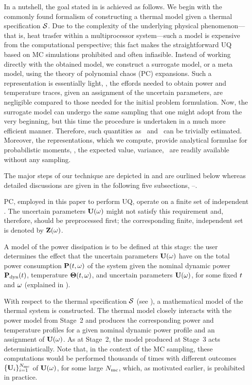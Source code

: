 
In a nutshell, the goal stated in  is achieved as follows. We begin with the commonly found formalism of constructing a thermal model given a thermal specification $\mathcal{S}$. Due to the complexity of the underlying physical phenomenon---that is, heat trasfer within a multiprocessor system---such a model is expensive from the computational perspective; this fact makes the straightforward UQ based on MC simulations prohibited and often infiasible. Instead of working directly with the obtained model, we construct a surrogate model, or a meta model, using the theory of polynomial chaos (PC) expansions. Such a representation is essentially light, \ie, the effords needed to obtain power and temperature traces, given an assignment of the uncertain parameters, are negligible compared to those needed for the initial problem formulation. Now, the surrogate model can undergo the same sampling that one might adopt from the very beginning, but this time the procedure is undertaken in a much more efficient manner. Therefore, such quantities as \cdfs\ and \pdfs\ can be trivially estimated. Moreover, the representations, which we compute, provide analytical formulae for probabilistic moments, \ie, the expected value, variance, \etc\ are readily available without any sampling.

The major steps of our technique are depicted in  and are ourlined below whereas detailed discussions are given in the following five subsections, --.

 PC, employed in this paper to perform UQ, operate on a finite set of independent \rvs. The uncertain parameters $\mathbf{U}(\omega)$ might not satisfy this requirement and, therefore, should be preprocessed first; the corresponding finite, independent set is denoted by $\mathbf{Z}(\omega)$.

 A model of the power dissipation is to be defined at this stage: the user determines the effect that the uncertain parameters $\mathbf{U}(\omega)$ have on the total power consumption $\mathbf{P}(t, \omega)$ of the system given the nominal dynamic power $\mathbf{P}_{\text{dyn}}(t)$, temperature ${\boldsymbol\Theta}(t, \omega)$, and uncertain parameters $\mathbf{U}(\omega)$, for some fixed $t$ and $\omega$ (explained in ).

 With respect to the thermal specification $\mathcal{S}$ (see ), a mathematical model of the thermal system is constructed. The thermal model closely interacts with the power model from Stage~2 and produces the corresponding power and temperature profiles for a given nominal dynamic power profile and an assignment of $\mathbf{U}(\omega)$. As at Stage~2, the model produced at Stage~3 acts deterministically. Note that, in the context of the MC sampling, these computations would be performed thousands of times with different outcomes $\{ \mathbf{U}_i \}_{i = 1}^{N_\text{mc}}$ of $\mathbf{U}(\omega)$, for some large $N_\text{mc}$, which, as motivated earlier, is prohibited in practice.

